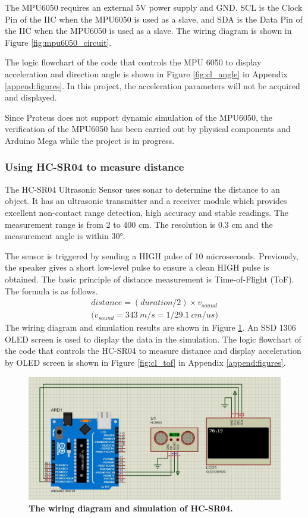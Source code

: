 The MPU6050 requires an external 5V power supply and GND. SCL is the Clock Pin of the IIC when the 
MPU6050 is used as a slave, and SDA is the Data Pin of the IIC when the MPU6050 is used as a slave. The wiring 
diagram is shown in Figure \ref{fig:mpu6050_circuit}. 

The logic flowchart of the code that controls the MPU 6050 to display acceleration and direction angle is shown 
in Figure \ref{fig:cl_angle} in Appendix \ref{append:figures}. In this project, the acceleration parameters will 
not be acquired and displayed.

Since Proteus does not support dynamic simulation of the MPU6050, the verification of the MPU6050 has been 
carried out by physical components and Arduino Mega while the project is in progress.  
\subsubsection{Using HC-SR04 to measure distance}
The HC-SR04 Ultrasonic Sensor uses sonar to determine the distance to an object. It has an ultrasonic 
transmitter and a receiver module which provides excellent non-contact range detection, high accuracy and 
stable readings. The measurement range is from 2 to 400 cm. The resolution is 0.3 cm and the measurement angle 
is within 30°.

The sensor is triggered by sending a HIGH pulse of 10 microseconds. Previously, the speaker gives a short 
low-level pulse to ensure a clean HIGH pulse is obtained. 
The basic principle of distance measurement is Time-of-Flight (ToF). The formula is as follows.
\vspace{-10mm}
\begin{align}
    distance = (duration/2) \times v_{sound} \\
    \text{(}v_{sound} = 343\ m/s = 1/29.1\ cm/us \text{)}\nonumber
\end{align}
The wiring diagram and simulation results are shown in Figure \ref{fig:tof}. An SSD 1306 OLED screen 
is used to display the data in the simulation. The logic flowchart of the code that controls the HC-SR04 to measure 
distance and display acceleration by OLED screen is shown in Figure \ref{fig:cl_tof} in Appendix \ref{append:figures}.
\begin{figure}[H] %
    \centering 
    \captionsetup{labelsep=colon}
    \includegraphics[width=0.9\linewidth]{Image/Design/tof_circuit.jpg}
    \caption[The wiring diagram and simulation of HC-SR04]
    {\centering \textbf{The wiring diagram and simulation of HC-SR04.}}
    \label{fig:tof}
\end{figure}

